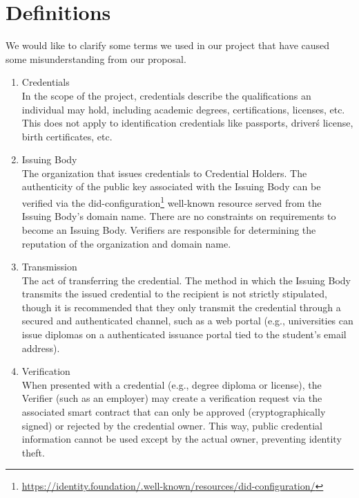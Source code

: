 \section{Definitions}
We would like to clarify some terms we used in our project that have caused some misunderstanding
from our proposal.

\begin{enumerate}
    \item Credentials \\
        In the scope of the project, credentials describe the qualifications an individual may hold, including academic degrees, certifications, licenses, etc.
        This does not apply to identification credentials like passports, driver\'s license, birth
        certificates, etc.
    \item Issuing Body \\
        The organization that issues credentials to Credential Holders. The authenticity of the public key associated with the Issuing Body can be verified via the 
        {did-configuration}\footnote{\url{https://identity.foundation/.well-known/resources/did-configuration/}} well-known resource served from the Issuing Body’s domain name. There are no constraints on requirements to become an Issuing Body. Verifiers are responsible for determining the reputation of the organization and domain name.
    \item Transmission \\
        The act of transferring the credential. The method in which the Issuing Body transmits the issued credential to the recipient is not strictly stipulated, though it is recommended that they only transmit the credential through a secured and authenticated channel, such as a web portal (e.g., universities can issue diplomas on a authenticated issuance portal tied to the student’s email address).
    \item Verification \\
        When presented with a credential (e.g., degree diploma or license), the Verifier (such as an employer) may create a verification request via the associated smart contract that can only be approved (cryptographically signed) or rejected by the credential owner. This way, public credential information cannot be used except by the actual owner, preventing identity theft.
\end{enumerate}

